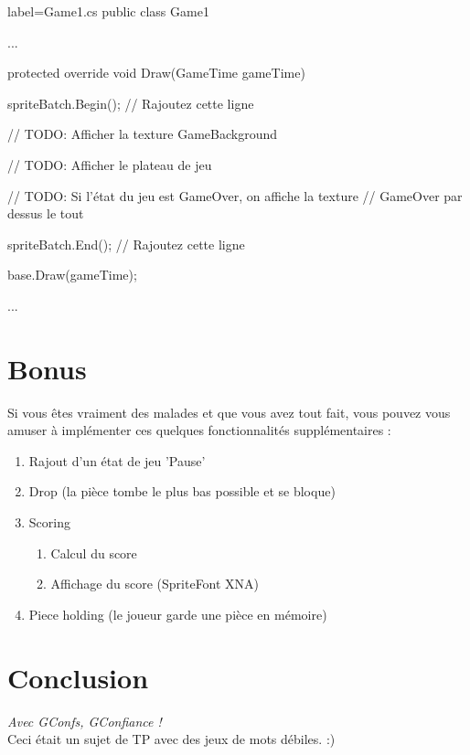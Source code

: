 \documentclass[a4paper]{article}
\begin{document}
\begin{csharpcode*}{label=Game1.cs}
public class Game1
{
    ...

    protected override void Draw(GameTime gameTime)
    {
        spriteBatch.Begin(); // Rajoutez cette ligne

        // TODO: Afficher la texture GameBackground

        // TODO: Afficher le plateau de jeu

        // TODO: Si l'état du jeu est GameOver, on affiche la texture
        //       GameOver par dessus le tout

        spriteBatch.End(); // Rajoutez cette ligne

        base.Draw(gameTime);
    }

    ...
}    
\end{csharpcode*}

\section{Bonus}

Si vous êtes vraiment des malades et que vous avez tout fait, vous pouvez vous
amuser à implémenter ces quelques fonctionnalités supplémentaires :

\begin{enumerate}
    \item Rajout d'un état de jeu 'Pause'
    \item Drop (la pièce tombe le plus bas possible et se bloque)
    \item Scoring
        \begin{enumerate}
            \item Calcul du score
            \item Affichage du score (SpriteFont XNA)
        \end{enumerate}
    \item Piece holding (le joueur garde une pièce en mémoire)
\end{enumerate}

\section{Conclusion}

\emph{Avec GConfs, GConfiance !} \\

Ceci était un sujet de TP avec des jeux de mots débiles. :)

%
\end{document}
